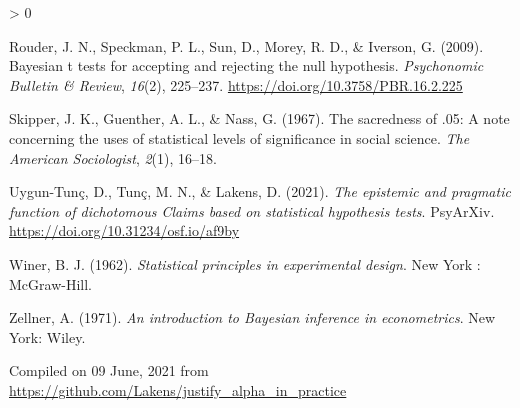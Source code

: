 \documentclass[
  english,
  ,jou, a4paper,floatsintext]{apa6}
\newlength{\cslhangindent}
\newenvironment{CSLReferences}[2] %
 {%
  \setlength{\parindent}{0pt}
  \ifodd #1 \everypar{\setlength{\hangindent}{\cslhangindent}}\ignorespaces\fi
  \ifnum #2 > 0
  \setlength{\parskip}{#2\baselineskip}
  \fi
 }%
 {}
\begin{document}
\begin{CSLReferences}{1}{0}
\leavevmode\hypertarget{ref-rouder_bayesian_2009}{}%
Rouder, J. N., Speckman, P. L., Sun, D., Morey, R. D., \& Iverson, G. (2009). Bayesian t tests for accepting and rejecting the null hypothesis. \emph{Psychonomic Bulletin \& Review}, \emph{16}(2), 225--237. \url{https://doi.org/10.3758/PBR.16.2.225}

\leavevmode\hypertarget{ref-skipper_sacredness_1967}{}%
Skipper, J. K., Guenther, A. L., \& Nass, G. (1967). The sacredness of .05: A note concerning the uses of statistical levels of significance in social science. \emph{The American Sociologist}, \emph{2}(1), 16--18.

\leavevmode\hypertarget{ref-tunc_epistemic_2021}{}%
Uygun-Tunç, D., Tunç, M. N., \& Lakens, D. (2021). \emph{The epistemic and pragmatic function of dichotomous {Claims} based on statistical hypothesis tests}. PsyArXiv. \url{https://doi.org/10.31234/osf.io/af9by}

\leavevmode\hypertarget{ref-winer_statistical_1962}{}%
Winer, B. J. (1962). \emph{Statistical principles in experimental design}. {New York : McGraw-Hill}.

\leavevmode\hypertarget{ref-zellner_introduction_1971}{}%
Zellner, A. (1971). \emph{An introduction to {Bayesian} inference in econometrics}. {New York}: {Wiley}.

\end{CSLReferences}

\endgroup

Compiled on 09 June, 2021 from \url{https://github.com/Lakens/justify_alpha_in_practice}
\end{document}

